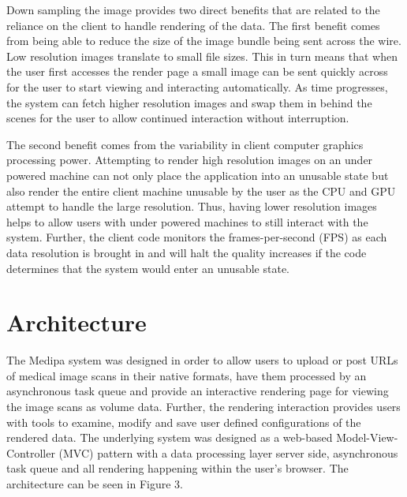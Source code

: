 \documentclass[annual]{acmsiggraph}
\begin{document}
Down sampling the image provides two direct benefits that are related to the reliance on the client to handle rendering of the data.  The first benefit comes from being able to reduce the size of the image bundle being sent across the wire.  Low resolution images translate to small file sizes.  This in turn means that when the user first accesses the render page a small image can be sent quickly across for the user to start viewing and interacting automatically.  As time progresses, the system can fetch higher resolution images and swap them in behind the scenes for the user to allow continued interaction without interruption.  

The second benefit comes from the variability in client computer graphics processing power.  Attempting to render high resolution images on an under powered machine can not only place the application into an unusable state but also render the entire client machine unusable by the user as the CPU and GPU attempt to handle the large resolution.  Thus, having lower resolution images helps to allow users with under powered machines to still interact with the system.  Further, the client code monitors the frames-per-second (FPS) as each data resolution is brought in and will halt the quality increases if the code determines that the system would enter an unusable state.

\section{Architecture}
	The Medipa system was designed in order to allow users to upload or post URLs of medical image scans in their native formats, have them processed by an asynchronous task queue and provide an interactive rendering page for viewing the image scans as volume data.  Further, the rendering interaction provides users with tools to examine, modify and save user defined configurations of the rendered data.  The underlying system was designed as a web-based Model-View-Controller (MVC) pattern with a data processing layer server side, asynchronous task queue and all rendering happening within the user's browser.  The architecture can be seen in Figure 3.
\end{document}
